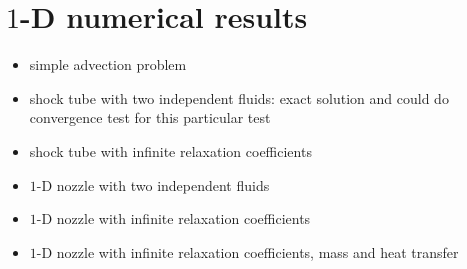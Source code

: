 \documentclass[preprint,10pt]{elsarticle}
\begin{document}
\section{$1$-D numerical results}\label{sec:results}
\begin{itemize}
\item simple advection problem
\item shock tube with two independent fluids: exact solution and could do convergence test for this particular test
\item shock tube with infinite relaxation coefficients
\item $1$-D nozzle with two independent fluids
\item $1$-D nozzle with infinite relaxation coefficients
\item $1$-D nozzle with infinite relaxation coefficients,  mass and heat transfer
\end{itemize}

\clearpage
\end{document}

